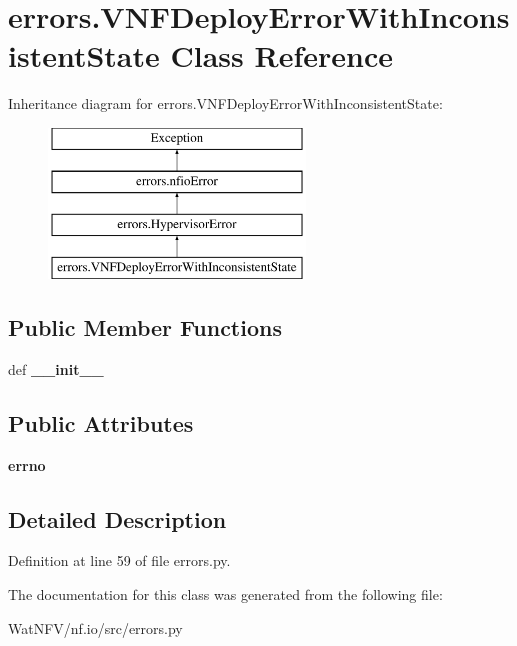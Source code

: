 \hypertarget{classerrors_1_1VNFDeployErrorWithInconsistentState}{\section{errors.\-V\-N\-F\-Deploy\-Error\-With\-Inconsistent\-State Class Reference}
\label{classerrors_1_1VNFDeployErrorWithInconsistentState}
}
Inheritance diagram for errors.\-V\-N\-F\-Deploy\-Error\-With\-Inconsistent\-State\-:\begin{figure}[H]
\begin{center}
\leavevmode
\includegraphics[height=4.000000cm]{classerrors_1_1VNFDeployErrorWithInconsistentState}
\end{center}
\end{figure}
\subsection*{Public Member Functions}
\begin{DoxyCompactItemize}
\item 
\hypertarget{classerrors_1_1VNFDeployErrorWithInconsistentState_a9b0a39ff4609e26174942323865fb6a3}{def {\bfseries \-\_\-\-\_\-init\-\_\-\-\_\-}}\label{classerrors_1_1VNFDeployErrorWithInconsistentState_a9b0a39ff4609e26174942323865fb6a3}

\end{DoxyCompactItemize}
\subsection*{Public Attributes}
\begin{DoxyCompactItemize}
\item 
\hypertarget{classerrors_1_1VNFDeployErrorWithInconsistentState_ae4ac3cc6887b7e1483a209649d18d4b0}{{\bfseries errno}}\label{classerrors_1_1VNFDeployErrorWithInconsistentState_ae4ac3cc6887b7e1483a209649d18d4b0}

\end{DoxyCompactItemize}


\subsection{Detailed Description}


Definition at line 59 of file errors.\-py.



The documentation for this class was generated from the following file\-:\begin{DoxyCompactItemize}
\item 
Wat\-N\-F\-V/nf.\-io/src/errors.\-py\end{DoxyCompactItemize}
